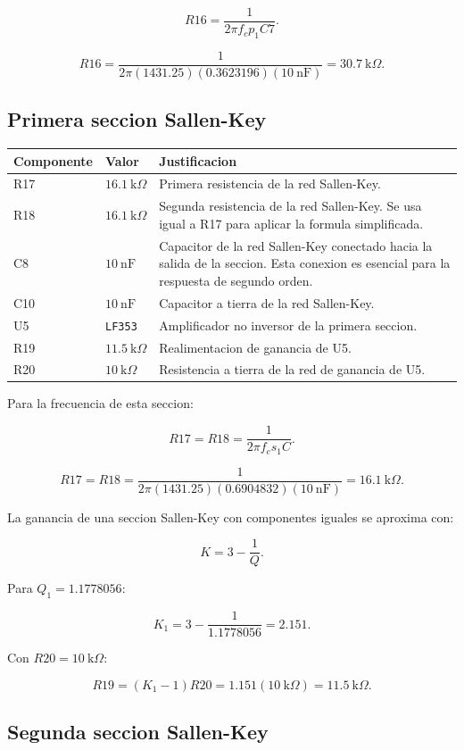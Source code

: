 ﻿\documentclass[11pt,letterpaper]{article}
\newcommand{\kohm}{\text{k}\Omega}
\begin{document}
\[
R16=\frac{1}{2\pi f_cp_1C7}.
\]

\[
R16=
\frac{1}{2\pi(1431.25)(0.3623196)(10~\text{nF})}
=30.7~\kohm.
\]

\subsection{Primera seccion Sallen-Key}

\begin{longtable}{p{2.0cm}p{4.2cm}p{8.7cm}}
\toprule
Componente & Valor & Justificacion \\
\midrule
\endhead
R17 & \(16.1~\kohm\) & Primera resistencia de la red Sallen-Key. \\
R18 & \(16.1~\kohm\) & Segunda resistencia de la red Sallen-Key. Se usa igual
a R17 para aplicar la formula simplificada. \\
C8 & \(10~\text{nF}\) & Capacitor de la red Sallen-Key conectado hacia la
salida de la seccion. Esta conexion es esencial para la respuesta de segundo
orden. \\
C10 & \(10~\text{nF}\) & Capacitor a tierra de la red Sallen-Key. \\
U5 & \texttt{LF353} & Amplificador no inversor de la primera seccion. \\
R19 & \(11.5~\kohm\) & Realimentacion de ganancia de U5. \\
R20 & \(10~\kohm\) & Resistencia a tierra de la red de ganancia de U5. \\
\bottomrule
\end{longtable}

Para la frecuencia de esta seccion:

\[
R17=R18=\frac{1}{2\pi f_cs_1C}.
\]

\[
R17=R18=
\frac{1}{2\pi(1431.25)(0.6904832)(10~\text{nF})}
=16.1~\kohm.
\]

La ganancia de una seccion Sallen-Key con componentes iguales se aproxima con:

\[
K=3-\frac{1}{Q}.
\]

Para \(Q_1=1.1778056\):

\[
K_1=3-\frac{1}{1.1778056}=2.151.
\]

Con \(R20=10~\kohm\):

\[
R19=(K_1-1)R20=1.151(10~\kohm)=11.5~\kohm.
\]

\subsection{Segunda seccion Sallen-Key}
\end{document}
